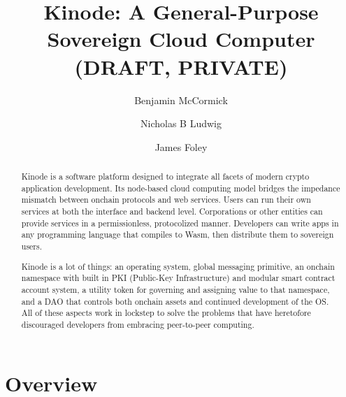 \documentclass[runningheads]{llncs}
\begin{document}
%
\title{Kinode: A General-Purpose Sovereign Cloud Computer (DRAFT, PRIVATE)}
%
%
\author{
Benjamin McCormick \and
Nicholas B Ludwig \and
James Foley
}
%
%
\institute{ }
%
\maketitle              %
%
\begin{abstract}
Kinode is a software platform designed to integrate all facets of modern crypto application development.
Its node-based cloud computing model bridges the impedance mismatch between onchain protocols and web services.
Users can run their own services at both the interface and backend level.
Corporations or other entities can provide services in a permissionless, protocolized manner.
Developers can write apps in any programming language that compiles to Wasm, then distribute them to sovereign users. %

Kinode is a lot of things: an operating system, global messaging primitive, 
an onchain namespace with built in PKI (Public-Key Infrastructure) and modular smart contract account system,
a utility token for governing and assigning value to that namespace, 
and a DAO that controls both onchain assets and continued development of the OS.
All of these aspects work in lockstep to solve the problems that have heretofore discouraged developers from embracing peer-to-peer computing.

\end{abstract}
%
%
%
\tableofcontents
%
%
%
\section{Overview}
\label{sec:overview}
\end{document}
